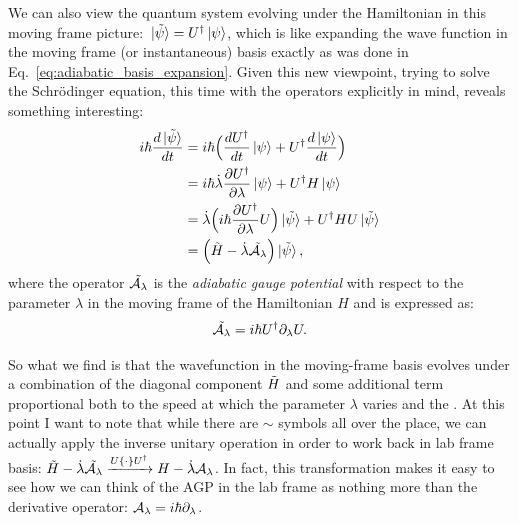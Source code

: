     We can also view the quantum system evolving under the Hamiltonian in this moving frame picture: $\ket*{\Tilde{\psi}} = U^{\dagger}\ket{\psi}$, which is like expanding the wave function in the moving frame (or instantaneous) basis exactly as was done in Eq.~\eqref{eq:adiabatic_basis_expansion}. Given this new viewpoint, trying to solve the Schr\"{o}dinger equation, this time with the operators explicitly in mind, reveals something interesting:
    \begin{equation}\label{eq:moving_frame_schrodinger}
        \begin{aligned}
            i \hbar \frac{d \ket*{\Tilde{\psi}}}{dt} &= i \hbar \Big( \frac{d U^{\dagger}}{dt}\ket*{\psi} + U^{\dagger} \frac{d \ket{\psi}}{dt} \Big) \\
            &= i \hbar \dot{\lambda} \frac{\partial U^{\dagger}}{\partial \lambda}\ket{\psi} + U^{\dagger} H\ket{\psi}\\
            &= \dot{\lambda} \Big(i\hbar \frac{\partial U^{\dagger}}{\partial \lambda}U \Big)\ket*{\Tilde{\psi}} + U^{\dagger} H U \ket*{\Tilde{\psi}} \\
            &= \Big(\Tilde{H} - \dot{\lambda}\Tilde{\mathcal{A}_{\lambda}}\Big) \ket*{\Tilde{\psi}},
        \end{aligned}
    \end{equation}
    where the operator $\Tilde{\mathcal{A}_{\lambda}}$ is the \emph{adiabatic gauge potential} with respect to the parameter $\lambda$ in the moving frame of the Hamiltonian $H$ and is expressed as:
    \begin{equation}\label{eq:AGP_in_terms_of_U}
        \Tilde{\mathcal{A}_{\lambda}} = i\hbar U^{\dagger}\partial_{\lambda} U.
    \end{equation}
    
    So what we find is that the wavefunction in the moving-frame basis evolves under a combination of the diagonal component $\Tilde{H}$ and some additional term proportional both to the speed at which the parameter $\lambda$ varies and the . At this point I want to note that while there are $\sim$ symbols all over the place, we can actually apply the inverse unitary operation in order to work back in lab frame basis: $\Tilde{H} - \dot{\lambda}\Tilde{\mathcal{A}_{\lambda}} \xrightarrow{U \{ \cdot \} U^{\dagger}} H - \dot{\lambda} \mathcal{A}_{\lambda}$. In fact, this transformation makes it easy to see how we can think of the AGP in the lab frame as nothing more than the derivative operator: $\mathcal{A}_{\lambda} = i\hbar\partial_{\lambda}$. 

